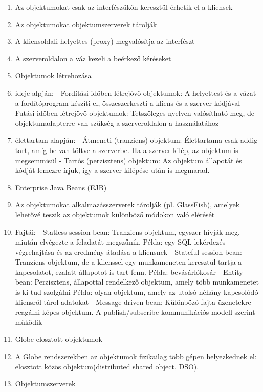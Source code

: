 \documentclass[twoside, a4paper, 12pt]{article}
\begin{document}
\begin{enumerate}
    \item Az objektumokat csak az interfészükön keresztül érhetik el a kliensek
    \item Az objektumokat objektumszerverek tárolják
    \item A kliensoldali helyettes (proxy) megvalósítja az interfészt
    \item A szerveroldalon a váz kezeli a beérkező kéréseket
    \item  Objektumok létrehozása
    \item ideje alpján:
        - Fordítási időben létrejövő objektumok: A helyettest és a vázat a fordítóprogram készíti el,
        összeszerkeszti a kliens és a szerver kódjával
        - Futási időben létrejövő objektumok: Tetszőleges nyelven valósítható meg, de objektumadapterre van
        szükség a szerveroldalon a használatához
    \item élettartam alapján:
        - Átmeneti (tranziens) objektum: Élettartama csak addig tart, amíg be van töltve a szerverbe. 
        Ha a szerver kilép, az objektum is megsemmisül
        - Tartós (perzisztens) objektum: Az objektum állapotát és kódját lemezre írjuk, így a szerver kilépése után
        is megmarad.
    \item  Enterprise Java Beans (EJB)
    \item Az objektumokat alkalmazásszerverek tárolják (pl. GlassFish), amelyek lehetővé teszik az objektumok
        különböző módokon való elérését
    \item Fajtái:
        - Statless session bean: Tranziens objektum, egyszer hívják meg, miután elvégezte a feladatát megszűnik.
        Példa: egy SQL lekérdezés végrehajtása és az eredmény átadása a kliensnek
        - Stateful session bean: Tranziens objektum, de a klienssel egy munkameneten keresztül tartja a kapcsolatot,
        ezalatt állapotot is tart fenn. Példa: bevásárlókosár
        - Entity bean: Perzisztens, állapottal rendelkező objektum, amely több munkamenetet is ki tud szolgálni
        Példa: olyan objektum, amely az utolsó néhány kapcsolódó kliensről tárol adatokat
        - Message-driven bean: Különböző fajta üzenetekre reagálni képes objektum. A publish/subscribe kommunikációs
        modell szerint működik
    \item  Globe elosztott objektumok
    \item A Globe rendszerekben az objektumok fizikailag több gépen helyezkednek el: elosztott közös objektum(distributed shared object, DSO).
    \item  Objektumszerverek

\end{enumerate}
\end{document}
